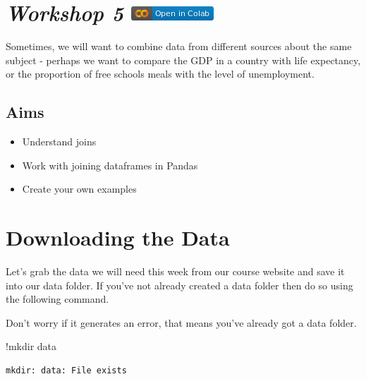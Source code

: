 \documentclass[
  letterpaper,
  DIV=11,
  numbers=noendperiod]{scrreprt}
\newenvironment{Shaded}{\begin{snugshade}}{\end{snugshade}}
\newcommand{\NormalTok}[1]{\textcolor[rgb]{0.00,0.23,0.31}{#1}}
\newcommand{\OperatorTok}[1]{\textcolor[rgb]{0.37,0.37,0.37}{#1}}
\providecommand{\tightlist}{%
  \setlength{\itemsep}{0pt}\setlength{\parskip}{0pt}}\usepackage{longtable,booktabs,array}
\begin{document}
\hypertarget{workshop-5-open-in-colab}{%
\section[\emph{Workshop 5} ]{\texorpdfstring{\emph{Workshop 5}
\href{https://colab.research.google.com/github/oballinger/QM2/blob/main/notebooks/W05.\%20Merging\%20and\%20Joining.ipynb}{\protect\includegraphics{notebooks/../colab-badge.png}}}{Workshop 5 Open In Colab}}\label{workshop-5-open-in-colab}}

Sometimes, we will want to combine data from different sources about the
same subject - perhaps we want to compare the GDP in a country with life
expectancy, or the proportion of free schools meals with the level of
unemployment.

\hypertarget{aims-2}{%
\subsection{Aims}\label{aims-2}}

\begin{itemize}
\tightlist
\item
  Understand joins
\item
  Work with joining dataframes in Pandas
\item
  Create your own examples
\end{itemize}

\hypertarget{downloading-the-data-3}{%
\section{Downloading the Data}\label{downloading-the-data-3}}

Let's grab the data we will need this week from our course website and
save it into our data folder. If you've not already created a data
folder then do so using the following command.

Don't worry if it generates an error, that means you've already got a
data folder.

\begin{Shaded}
\begin{Highlighting}[]
\OperatorTok{!}\NormalTok{mkdir data}
\end{Highlighting}
\end{Shaded}

\begin{verbatim}
mkdir: data: File exists
\end{verbatim}
\end{document}
